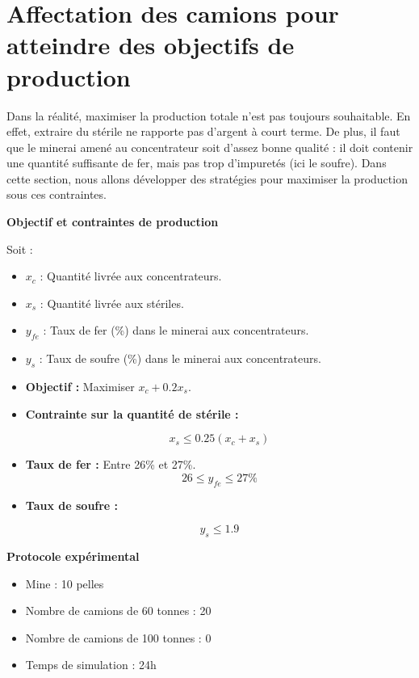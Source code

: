 \section{Affectation des camions pour atteindre des objectifs de production}
\label{sec:objectifs}

Dans la réalité, maximiser la production totale n'est pas toujours souhaitable. En effet, extraire du stérile ne rapporte pas d'argent à court terme. De plus, il faut que le minerai amené au concentrateur soit d'assez bonne qualité : il doit contenir une quantité suffisante de fer, mais pas trop d'impuretés (ici le soufre). Dans cette section, nous allons développer des stratégies pour maximiser la production sous ces contraintes.


\vspace{10pt}
\noindent \textbf{\Large \textbf{Objectif et contraintes de production} } 

\noindent Soit :

\begin{itemize}
	\item $x_c$ : Quantité livrée aux concentrateurs.
	\item $x_s$ : Quantité livrée aux stériles.
	\item $y_{fe}$ : Taux de fer (\%) dans le minerai aux concentrateurs.
	\item $y_{s}$ : Taux de soufre (\%) dans le minerai aux concentrateurs.
\end{itemize}


\begin{itemize}
	\item \textbf{Objectif : } Maximiser $x_c + 0.2 x_s$.
	\item \textbf{Contrainte sur la quantité de stérile : } 
	
	\[x_s \leq 0.25 (x_c+x_s)\]
	
	\item \textbf{Taux de fer : } Entre 26\% et 27\%.
	\[ 26 \leq y_{fe} \leq 27\% \]
	
	\item \textbf{Taux de soufre : } 
	
	\[y_s \leq 1.9\]
\end{itemize}

\vspace{10pt}
\noindent \textbf{\Large \textbf{Protocole expérimental }} 
\begin{itemize}
	\item Mine : 10 pelles
	\item Nombre de camions de 60 tonnes : 20
	\item Nombre de camions de 100 tonnes : 0
	\item Temps de simulation : 24h
\end{itemize}


